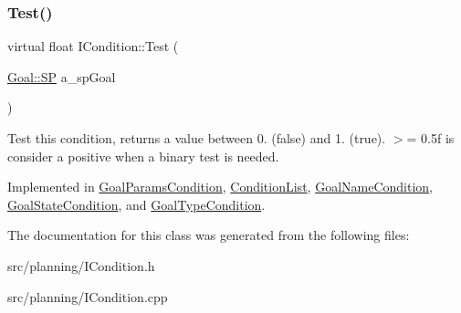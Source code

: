 \subsubsection{\texorpdfstring{Test()}{Test()}}
{\footnotesize\ttfamily virtual float I\+Condition\+::\+Test (\begin{DoxyParamCaption}\item[{\hyperlink{class_goal_a818ae12a4d1f28bd433dab2a830a390e}{Goal\+::\+SP}}]{a\+\_\+sp\+Goal }\end{DoxyParamCaption})\hspace{0.3cm}{\ttfamily [pure virtual]}}

Test this condition, returns a value between 0. (false) and 1. (true). $>$= 0.\+5f is consider a positive when a binary test is needed. 

Implemented in \hyperlink{struct_goal_params_condition_a125b15ce9cee3898a7fe10e4af48c92b}{Goal\+Params\+Condition}, \hyperlink{struct_condition_list_a4b86083a53a1f1eea704c6857345661f}{Condition\+List}, \hyperlink{struct_goal_name_condition_a6434fe4ff3bef37f804d7ae350f7ccc2}{Goal\+Name\+Condition}, \hyperlink{struct_goal_state_condition_a43167bb48fbca9fd20101fb8ed192b53}{Goal\+State\+Condition}, and \hyperlink{struct_goal_type_condition_aa52cd4e208ed256e063d339ab967e610}{Goal\+Type\+Condition}.



The documentation for this class was generated from the following files\+:\begin{DoxyCompactItemize}
\item 
src/planning/I\+Condition.\+h\item 
src/planning/I\+Condition.\+cpp\end{DoxyCompactItemize}
